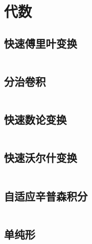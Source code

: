 \section{代数}
\subsection{快速傅里叶变换}
\inputminted{cpp}{\source/algebra/fast-fourier-transform.cpp}
\subsection{分治卷积}
\inputminted{cpp}{\source/algebra/cdq+fft.cpp}
\subsection{快速数论变换}
\inputminted{cpp}{\source/algebra/fast-numerical-transform.cpp}
\subsection{快速沃尔什变换}
\inputminted{cpp}{\source/algebra/FWT.cpp}
\subsection{自适应辛普森积分}
\inputminted{cpp}{\source/algebra/adaptive-simpsons-method.cpp}
\subsection{单纯形}
\inputminted{cpp}{\source/algebra/simplex.cpp}

